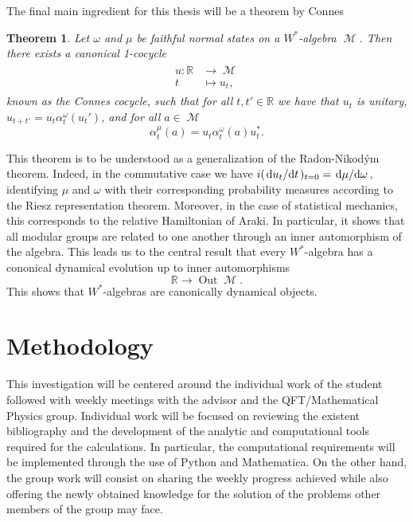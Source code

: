 \documentclass{article}
\DeclareMathOperator{\Out}{Out}
\DeclareMathOperator{\M}{\mathcal{M}}
\newtheorem{theorem}{Theorem}[section]
\begin{document}
The final main ingredient for this thesis will be a theorem by Connes\cite{Connes1973}
\begin{theorem}
	Let $\omega$ and $\mu$ be faithful normal states on a $W^*$-algebra $\M$. Then there exists a canonical 1-cocycle
	\begin{align}
	\begin{split}
		u:\mathbb{R}&\rightarrow\M\\
		t&\mapsto u_t,
	\end{split}
	\end{align}	 
	known as the Connes cocycle, such that for all $t,t'\in\mathbb{R}$ we have that $u_t$ is unitary, $u_{t+t'}=u_t\alpha^\omega_t(u_t')$, and for all $a\in\M$ 
	\begin{equation}
		\alpha^\mu_t(a)=u_t\alpha_t^\omega(a)u_t^*.
	\end{equation}
\end{theorem}
This theorem is to be understood as a generalization of the Radon-Nikod\'ym theorem. Indeed, in the commutative case we have $i(\dv*{u_t}{t})_{t=0}=\dv*{\mu}{\omega}$, identifying $\mu$ and $\omega$ with their corresponding probability measures according to the Riesz representation theorem. Moreover, in the case of statistical mechanics, this corresponds to the relative Hamiltonian of Araki\cite{Araki1973}. In particular, it shows that all modular groups are related to one another through an inner automorphism of the algebra. This leads us to the central result that every $W^*$-algebra has a cononical dynamical evolution up to inner automorphisms
\begin{equation}
\mathbb{R}\rightarrow\Out\M.
\end{equation}
This shows that $W^*$-algebras are canonically dynamical objects.


\section{Methodology}

This investigation will be centered around the individual work of the student followed with weekly meetings with the advisor and the QFT/Mathematical Physics group. Individual work will be focused on reviewing the existent bibliography and the development of the analytic and computational tools required for the calculations. In particular, the computational requirements will be implemented through the use of Python and Mathematica. On the other hand, the group work will consist on sharing the weekly progress achieved while also offering the newly obtained knowledge for the solution of the problems other members of the group may face.
\end{document}
